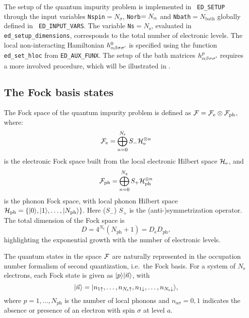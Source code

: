 \documentclass[edipack_sp.tex]{subfiles}
\begin{document}
The setup of the quantum impurity problem is implemented in {\tt
  ED\_SETUP} through the input variables {\tt Nspin}$=N_\sigma$,
{\tt Norb}$=N_\alpha$ and {\tt Nbath}$=N_\mathrm{bath}$ globally defined in {\tt
  ED\_INPUT\_VARS}. The variable {\tt Ns}$=N_\mathrm{s}$, evaluated in
{\tt ed\_setup\_dimensions}, corresponds to the total number of
electronic levels. 
The local non-interacting Hamiltonian
$h^0_{\alpha\beta\sigma\sigma'}$ is specified using the function {\tt ed\_set\_hloc} from {\tt ED\_AUX\_FUNX}.
The setup of the bath matrices $h^p_{\alpha\beta\sigma\sigma'}$
requires a more involved procedure, which will be illustrated in
. 


















\subsection{The Fock basis states}\label{sSecBasis}
The Fock space of the quantum impurity problem is defined as
${\cal F}={\cal F}_\mathrm{e}\otimes {\cal F}_\mathrm{ph}$, where: $$
{\cal F}_\mathrm{e}=\bigoplus_{n=0}^{N_\mathrm{s}}
S_-{\cal H}_\mathrm{e}^{\otimes n}
$$ 
is the electronic Fock space built 
from the local electronic Hilbert space ${\cal H}_\mathrm{e}$, and 
$$
{\cal F}_\mathrm{ph}=\bigoplus_{n=0}^{N_q}S_+{\cal H}_\mathrm{ph}^{\otimes n}
$$
is the
phonon Fock space, with local phonon Hilbert space
${\cal H}_\mathrm{ph}=\{|0\rangle,|1\rangle,\dots,|N_\mathrm{ph}\rangle\}$. 
Here ($S_-$) $S_+$ is the (anti-)symmetrization operator.  
%
The total dimension of the Fock space is
$$
D=4^{N_\mathrm{s}} (N_\mathrm{ph}+1)=D_\mathrm{e}D_\mathrm{ph},
$$ 
highlighting the exponential
growth with the number of electronic levels. 

The quantum states in the space ${\cal F}$ are naturally represented in
the occupation number formalism of second quantization,
i.e.~the Fock basis.
For a system of $N_\mathrm{s}$ electrons, each Fock state
is given as $|p\rangle|\vec{n}\rangle$, with
\begin{equation} \label{eq:FockState_|nupndw>}
    |\vec{n}\rangle=|n_{1\uparrow},\dots,n_{N_\mathrm{s}\uparrow},n_{1\downarrow},\dots,n_{N_\mathrm{s}\downarrow}\rangle,
\end{equation}
where $p=1,\dots,N_\mathrm{ph}$ is the number of local phonons and
$n_{a\sigma}=0,1$ indicates the absence or 
presence of an electron with spin $\sigma$ at level $a$.
\end{document}
